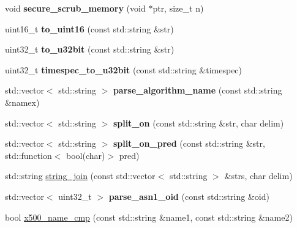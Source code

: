\begin{DoxyCompactItemize}
\item 
\mbox{\label{namespace_botan_a7a9d7a12e61c008ead17aa997a121020}} 
void {\bfseries secure\+\_\+scrub\+\_\+memory} (void $\ast$ptr, size\+\_\+t n)
\item 
\mbox{\label{namespace_botan_a569c3390529abdde0f41162d3af6d8d5}} 
uint16\+\_\+t {\bfseries to\+\_\+uint16} (const std\+::string \&str)
\item 
\mbox{\label{namespace_botan_ad34b62eb5711af655eaf6889be49f108}} 
uint32\+\_\+t {\bfseries to\+\_\+u32bit} (const std\+::string \&str)
\item 
\mbox{\label{namespace_botan_a797fe83136c7523933875d2e7e71c380}} 
uint32\+\_\+t {\bfseries timespec\+\_\+to\+\_\+u32bit} (const std\+::string \&timespec)
\item 
\mbox{\label{namespace_botan_a58cc9f5ed57c7080bf5a552272609b2d}} 
std\+::vector$<$ std\+::string $>$ {\bfseries parse\+\_\+algorithm\+\_\+name} (const std\+::string \&namex)
\item 
\mbox{\label{namespace_botan_a990f90d949cb747ca2c37c32957ed723}} 
std\+::vector$<$ std\+::string $>$ {\bfseries split\+\_\+on} (const std\+::string \&str, char delim)
\item 
\mbox{\label{namespace_botan_acd72f77956785fe39bc89a515267cb4a}} 
std\+::vector$<$ std\+::string $>$ {\bfseries split\+\_\+on\+\_\+pred} (const std\+::string \&str, std\+::function$<$ bool(char)$>$ pred)
\item 
std\+::string \mbox{\hyperlink{namespace_botan_a8ffe6aa56dd7683af8e6408daf290312}{string\+\_\+join}} (const std\+::vector$<$ std\+::string $>$ \&strs, char delim)
\item 
\mbox{\label{namespace_botan_a4ba74175ae95ba1a96e0d99f52539c71}} 
std\+::vector$<$ uint32\+\_\+t $>$ {\bfseries parse\+\_\+asn1\+\_\+oid} (const std\+::string \&oid)
\item 
bool \mbox{\hyperlink{namespace_botan_ab8509bd05c79dd4ea42fda5448fda5b5}{x500\+\_\+name\+\_\+cmp}} (const std\+::string \&name1, const std\+::string \&name2)
\item 

\end{DoxyCompactItemize}
